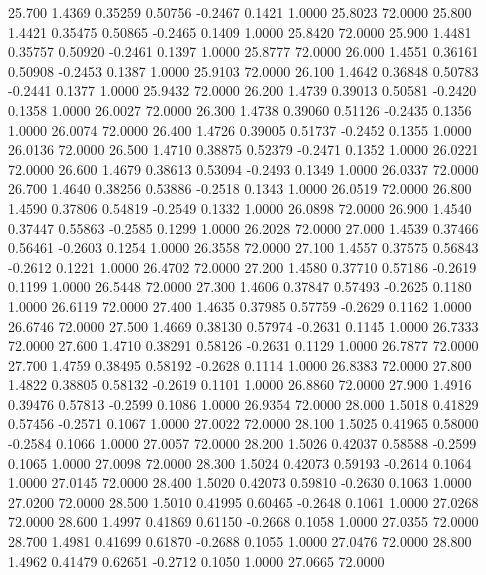   25.700   1.4369   0.35259   0.50756  -0.2467   0.1421   1.0000  25.8023  72.0000
  25.800   1.4421   0.35475   0.50865  -0.2465   0.1409   1.0000  25.8420  72.0000
  25.900   1.4481   0.35757   0.50920  -0.2461   0.1397   1.0000  25.8777  72.0000
  26.000   1.4551   0.36161   0.50908  -0.2453   0.1387   1.0000  25.9103  72.0000
  26.100   1.4642   0.36848   0.50783  -0.2441   0.1377   1.0000  25.9432  72.0000
  26.200   1.4739   0.39013   0.50581  -0.2420   0.1358   1.0000  26.0027  72.0000
  26.300   1.4738   0.39060   0.51126  -0.2435   0.1356   1.0000  26.0074  72.0000
  26.400   1.4726   0.39005   0.51737  -0.2452   0.1355   1.0000  26.0136  72.0000
  26.500   1.4710   0.38875   0.52379  -0.2471   0.1352   1.0000  26.0221  72.0000
  26.600   1.4679   0.38613   0.53094  -0.2493   0.1349   1.0000  26.0337  72.0000
  26.700   1.4640   0.38256   0.53886  -0.2518   0.1343   1.0000  26.0519  72.0000
  26.800   1.4590   0.37806   0.54819  -0.2549   0.1332   1.0000  26.0898  72.0000
  26.900   1.4540   0.37447   0.55863  -0.2585   0.1299   1.0000  26.2028  72.0000
  27.000   1.4539   0.37466   0.56461  -0.2603   0.1254   1.0000  26.3558  72.0000
  27.100   1.4557   0.37575   0.56843  -0.2612   0.1221   1.0000  26.4702  72.0000
  27.200   1.4580   0.37710   0.57186  -0.2619   0.1199   1.0000  26.5448  72.0000
  27.300   1.4606   0.37847   0.57493  -0.2625   0.1180   1.0000  26.6119  72.0000
  27.400   1.4635   0.37985   0.57759  -0.2629   0.1162   1.0000  26.6746  72.0000
  27.500   1.4669   0.38130   0.57974  -0.2631   0.1145   1.0000  26.7333  72.0000
  27.600   1.4710   0.38291   0.58126  -0.2631   0.1129   1.0000  26.7877  72.0000
  27.700   1.4759   0.38495   0.58192  -0.2628   0.1114   1.0000  26.8383  72.0000
  27.800   1.4822   0.38805   0.58132  -0.2619   0.1101   1.0000  26.8860  72.0000
  27.900   1.4916   0.39476   0.57813  -0.2599   0.1086   1.0000  26.9354  72.0000
  28.000   1.5018   0.41829   0.57456  -0.2571   0.1067   1.0000  27.0022  72.0000
  28.100   1.5025   0.41965   0.58000  -0.2584   0.1066   1.0000  27.0057  72.0000
  28.200   1.5026   0.42037   0.58588  -0.2599   0.1065   1.0000  27.0098  72.0000
  28.300   1.5024   0.42073   0.59193  -0.2614   0.1064   1.0000  27.0145  72.0000
  28.400   1.5020   0.42073   0.59810  -0.2630   0.1063   1.0000  27.0200  72.0000
  28.500   1.5010   0.41995   0.60465  -0.2648   0.1061   1.0000  27.0268  72.0000
  28.600   1.4997   0.41869   0.61150  -0.2668   0.1058   1.0000  27.0355  72.0000
  28.700   1.4981   0.41699   0.61870  -0.2688   0.1055   1.0000  27.0476  72.0000
  28.800   1.4962   0.41479   0.62651  -0.2712   0.1050   1.0000  27.0665  72.0000
